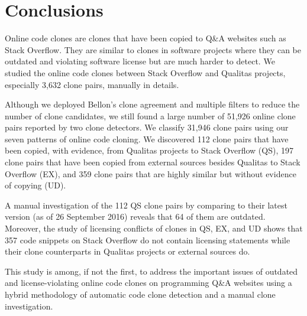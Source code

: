 \documentclass[sigconf,review, anonymous]{acmart}
\begin{document}
\section{Conclusions}
Online code clones are clones that have been copied to Q\&A websites such as Stack Overflow. They are similar to clones in software projects where they can be outdated and violating software license but are much harder to detect. We studied the online code clones between Stack Overflow and Qualitas projects, especially 3,632 clone pairs, manually in details. 

Although we deployed Bellon's clone agreement and multiple filters to reduce the number of clone candidates, we still found a large number of 51,926 online clone pairs reported by two clone detectors. We classify 31,946 clone pairs using our seven patterns of online code cloning. We discovered 112 clone pairs that have been copied, with evidence, from Qualitas projects to Stack Overflow (QS), 197 clone pairs that have been copied from external sources besides Qualitas to Stack Overflow (EX), and 359 clone pairs that are highly similar but without evidence of copying (UD).

A manual investigation of the 112 QS clone pairs by comparing to their latest version (as of 26 September 2016) reveals that 64 of them are outdated. Moreover, the study of licensing conflicts of clones in QS, EX, and UD shows that 357 code snippets on Stack Overflow do not contain licensing statements while their clone counterparts in Qualitas projects or external sources do.

This study is among, if not the first, to address the important issues of outdated and license-violating online code clones on programming Q\&A websites using a hybrid methodology of automatic code clone detection and a manual clone investigation.

%

  
\end{document}

